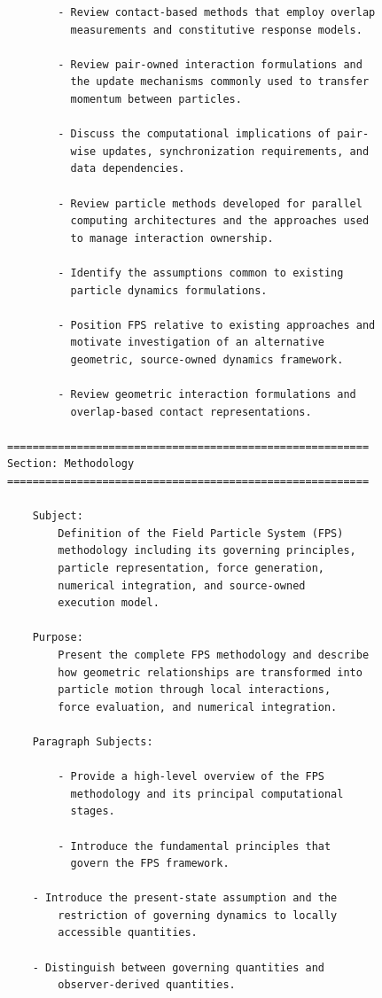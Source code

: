 \begin{verbatim}
        - Review contact-based methods that employ overlap
          measurements and constitutive response models.

        - Review pair-owned interaction formulations and
          the update mechanisms commonly used to transfer
          momentum between particles.

        - Discuss the computational implications of pair-
          wise updates, synchronization requirements, and
          data dependencies.

        - Review particle methods developed for parallel
          computing architectures and the approaches used
          to manage interaction ownership.

        - Identify the assumptions common to existing
          particle dynamics formulations.

        - Position FPS relative to existing approaches and
          motivate investigation of an alternative
          geometric, source-owned dynamics framework.
		  
		- Review geometric interaction formulations and
		  overlap-based contact representations.

=========================================================
Section: Methodology
=========================================================

    Subject:
        Definition of the Field Particle System (FPS)
        methodology including its governing principles,
        particle representation, force generation,
        numerical integration, and source-owned
        execution model.

    Purpose:
        Present the complete FPS methodology and describe
        how geometric relationships are transformed into
        particle motion through local interactions,
        force evaluation, and numerical integration.

    Paragraph Subjects:

        - Provide a high-level overview of the FPS
          methodology and its principal computational
          stages.

        - Introduce the fundamental principles that
          govern the FPS framework.

	- Introduce the present-state assumption and the
  		restriction of governing dynamics to locally
  		accessible quantities.

	- Distinguish between governing quantities and
  		observer-derived quantities.


\end{verbatim}
